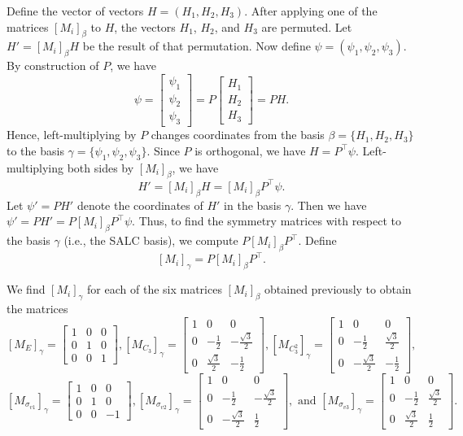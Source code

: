 \documentclass{article}
\begin{document}
    Define the vector of vectors $H=(H_1,H_2,H_3)$. After applying one of the matrices $[M_i]_\beta$ to $H$, the vectors $H_1$, $H_2$, and $H_3$ are permuted. Let $H'=[M_i]_\beta H$ be the result of that permutation. Now define $\psi=(\psi_1,\psi_2,\psi_3)$. By construction of $P$, we have \[\psi=\begin{bmatrix}\psi_1\\\psi_2\\\psi_3\end{bmatrix}=P\begin{bmatrix}H_1\\H_2\\H_3\end{bmatrix}=PH.\] Hence, left-multiplying by $P$ changes coordinates from the basis $\beta=\{H_1,H_2,H_3\}$ to the basis $\gamma=\{\psi_1,\psi_2,\psi_3\}$. Since $P$ is orthogonal, we have $H=P^\top\psi$. Left-multiplying both sides by $[M_i]_\beta$, we have \[H'=[M_i]_\beta H=[M_i]_\beta P^\top \psi.\] Let $\psi'=PH'$ denote the coordinates of $H'$ in the basis $\gamma$. Then we have $\psi'=PH'=P[M_i]_\beta P^\top\psi$. Thus, to find the symmetry matrices with respect to the basis $\gamma$ (i.e., the SALC basis), we compute $P[M_i]_\beta P^\top$. Define \[[M_i]_\gamma=P[M_i]_\beta P^\top.\]

    We find $[M_i]_\gamma$ for each of the six matrices $[M_i]_\beta$ obtained previously to obtain the matrices \[[M_E]_\gamma=\begin{bmatrix}1&0&0\\0&1&0\\0&0&1\end{bmatrix}, [M_{C_3}]_\gamma=\begin{bmatrix}1&0&0\\0&-\frac12&-\frac{\sqrt{3}}{2}\\0&\frac{\sqrt{3}}{2}&-\frac12\end{bmatrix}, [M_{C_3^2}]_\gamma=\begin{bmatrix}1&0&0\\0&-\frac12&\frac{\sqrt{3}}{2}\\0&-\frac{\sqrt{3}}{2}&-\frac12\end{bmatrix},\]
    \[[M_{\sigma_{v1}}]_\gamma=\begin{bmatrix}1&0&0\\0&1&0\\0&0&-1\end{bmatrix}, [M_{\sigma_{v2}}]_\gamma=\begin{bmatrix}1&0&0\\0&-\frac12&-\frac{\sqrt{3}}{2}\\0&-\frac{\sqrt{3}}{2}&\frac12\end{bmatrix}, \text{ and } [M_{\sigma_{v3}}]_\gamma=\begin{bmatrix}1&0&0\\0&-\frac12&\frac{\sqrt{3}}{2}\\0&\frac{\sqrt{3}}{2}&\frac12\end{bmatrix}.\]
\end{document}

